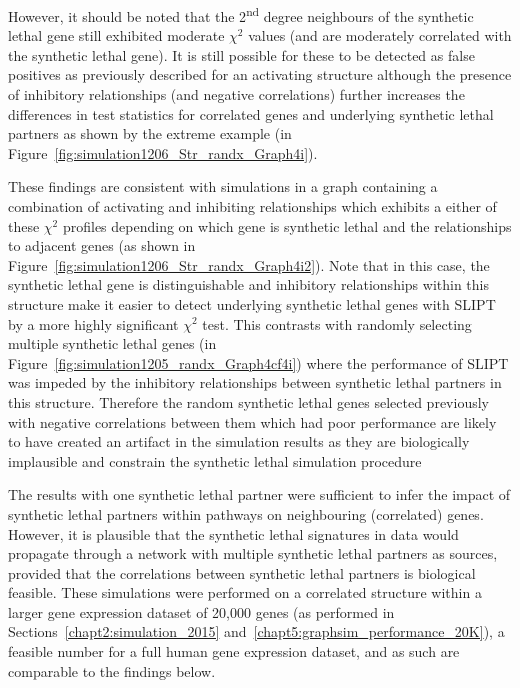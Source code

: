 
However, it should be noted that the 2\textsuperscript{nd} degree neighbours of the \gls{synthetic lethal} gene still exhibited moderate $\chi^2$ values (and are moderately correlated with the \gls{synthetic lethal} gene). It is still possible for these to be detected as false positives as previously described for an activating  structure although the presence of inhibitory relationships (and negative correlations) further increases the differences in test statistics for correlated genes and underlying \gls{synthetic lethal} partners as shown by the extreme example (in Figure~\ref{fig:simulation1206_Str_randx_Graph4i}).

These findings are consistent with simulations in a graph containing a combination of activating and inhibiting relationships which exhibits a either of these $\chi^2$ profiles depending on which gene is \gls{synthetic lethal} and the relationships to adjacent genes (as shown in Figure~\ref{fig:simulation1206_Str_randx_Graph4i2}). Note that in this case, the \gls{synthetic lethal} gene is distinguishable and inhibitory relationships within this  structure make it easier to detect underlying \gls{synthetic lethal} genes with \gls{SLIPT} by a more highly significant $\chi^2$ test. This contrasts with randomly selecting multiple \gls{synthetic lethal} genes (in Figure~\ref{fig:simulation1205_randx_Graph4cf4i}) where the performance of \gls{SLIPT} was impeded by the inhibitory relationships between \gls{synthetic lethal} partners in this  structure. Therefore the random \gls{synthetic lethal} genes selected previously with negative correlations between them which had poor performance are likely to have created an artifact in the simulation results as they are biologically implausible and constrain the \gls{synthetic lethal} simulation procedure

The results with one \gls{synthetic lethal} partner were sufficient to infer the impact of \gls{synthetic lethal} partners within pathways on neighbouring (correlated) genes. However,  it is plausible that the \gls{synthetic lethal} signatures in  data would propagate through a network with multiple \gls{synthetic lethal} partners as sources, provided that the correlations between \gls{synthetic lethal} partners is biological feasible. These simulations were performed on a correlated  structure within a larger \gls{gene expression} dataset of 20,000 genes (as performed in Sections~\ref{chapt2:simulation_2015} and~\ref{chapt5:graphsim_performance_20K}), a feasible number for a full human \gls{gene expression} dataset, and as such are comparable to the findings below.

